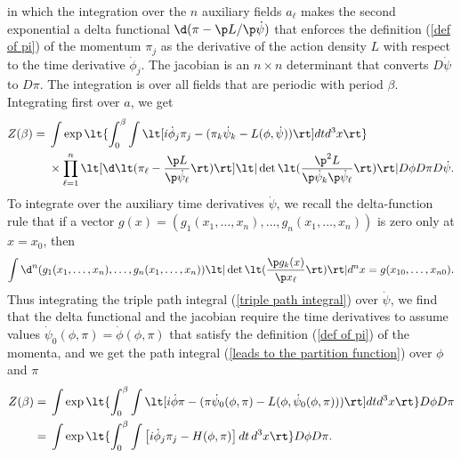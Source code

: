\documentclass[prd,preprint,floatfix,showpacs]{revtex4-1}
\begin{document}
in which the integration over
the \( n \) auxiliary fields \( a_\ell \) makes
the second exponential 
a delta functional 
\( \d( \pi -  \p L/ \p \dot \psi ) \) that enforces
the definition (\ref {def of pi}) of the momentum
\( \pi_j \)
as the derivative of the action density \( L \)
with respect to the time derivative \( \dot \phi_j \)\@.
The jacobian is an \( n \times n \) 
determinant that converts \( D\dot \psi \)
to \( D\pi \)\@.
The integration is over all fields 
that are periodic with period \( \beta \)\@.
Integrating first over \( a \), we get
\begin{equation}
   \begin{split}
Z(\beta) = {}&
\int \exp \lt\{ \int_0^\beta \int  \lt[ i \dot \phi_j \pi_j 
- ( \pi_k \dot \psi_k - L(\phi, \dot \psi) )
\rt] dt d^3x \rt\} \\
{}& \times \prod_{\ell=1}^n \lt[ \d \lt( \pi_\ell 
- \frac{ \p  L }{ \p \dot \psi_\ell } \rt) \rt]
\lt| \det \lt( \frac{ \p^2  L }
{ \p \dot \psi_k \p \dot \psi_\ell }  \rt) \rt|
D\phi D\pi D\dot\psi  .
\label {triple path integral}
   \end{split}
\end{equation}
To integrate over the 
auxiliary time derivatives \( \dot \psi \),
we recall the delta-function rule
that if a vector 
\( g(x) = (g_1(x_1, \dots, x_n),   \dots, g_n(x_1, \dots, x_n)) \)
is zero only at \( x = x_0 \), then 
\begin{equation}
\int \d^n( g_1(x_1, \dots, x_n),   \dots, g_n(x_1, \dots, x_n)) 
\lt| \det\lt(\frac{\p g_k(x)}{\p x_\ell} \rt) \rt| d^nx = {}
g(x_{10},\dots,x_{n0}) .
\end{equation}
Thus integrating the triple path integral
(\ref {triple path integral})
over \( \dot \psi \), we find that
the delta functional
and the jacobian require 
the time derivatives to assume values
\( \dot \psi_0(\phi,\pi) = \dot \phi(\phi,\pi) \)
that satisfy the definition (\ref {def of pi})
of the momenta,
and we get 
the path integral (\ref {leads to the partition function})
over \( \phi \) and \( \pi \)
\begin{equation}
   \begin{split}
Z(\beta) = {}&
\int \exp \lt\{ \int_0^\beta \int  \lt[ i \dot \phi \pi 
- ( \pi \dot \psi_0(\phi,\pi) - L(\phi, \dot \psi_0(\phi,\pi)) )
\rt] dt d^3x \rt\} D\phi D\pi 
\\
= {}&
\int \exp \lt\{ \int_0^\beta \int \left[ i \dot \phi_j \pi_j 
- H(\phi, \pi) \right] dt \, d^3x \rt\} D\phi D\pi .
\label {phi pi path integral redux}
   \end{split}
\end{equation}
\end{document}
